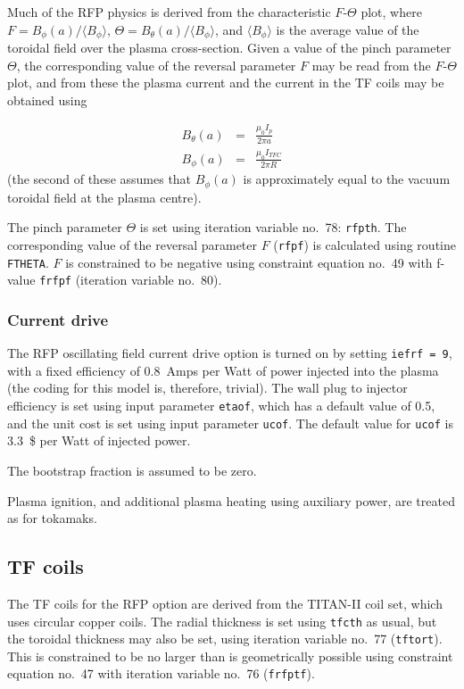 \documentclass[11pt,a4paper]{report}
\begin{document}
Much of the RFP physics is derived from the characteristic $F$-$\Theta$ plot,
where $F = B_\phi (a)/\langle B_\phi \rangle$, $\Theta = B_\theta (a)/\langle
B_\phi \rangle$, and $\langle B_\phi \rangle$ is the average value of the
toroidal field over the plasma cross-section. Given a value of the pinch
parameter $\Theta$, the corresponding value of the reversal parameter $F$ may
be read from the $F$-$\Theta$ plot, and from these the plasma current and the
current in the TF coils may be obtained using

\begin{eqnarray*}
  B_\theta (a) & = & \frac{\mu_0 I_p}{2\pi a} \\
  B_\phi (a)   & = & \frac{\mu_0 I_{TFC}}{2\pi R}
\end{eqnarray*}
(the second of these assumes that $B_\phi (a)$ is approximately equal to the
vacuum toroidal field at the plasma centre).

The pinch parameter $\Theta$ is set using iteration variable no.\ 78:
\texttt{rfpth}. The corresponding value of the reversal parameter $F$
(\texttt{rfpf}) is calculated using routine \texttt{FTHETA}. $F$ is
constrained to be negative using constraint equation no.\ 49 with f-value
\texttt{frfpf} (iteration variable no.\ 80).

\subsubsection{Current drive}
\label{sec:rfpcd}

The RFP oscillating field current drive option is turned on by setting
\texttt{iefrf = 9}, with a fixed efficiency of 0.8~Amps per Watt of power
injected into the plasma (the coding for this model is, therefore,
trivial). The wall plug to injector efficiency is set using input parameter
\texttt{etaof}, which has a default value of 0.5, and the unit cost is set
using input parameter \texttt{ucof}. The default value for \texttt{ucof} is
3.3~\$ per Watt of injected power.

The bootstrap fraction is assumed to be zero.

Plasma ignition, and additional plasma heating using auxiliary power, are
treated as for tokamaks.

\subsection{TF coils}

The TF coils for the RFP option are derived from the TITAN-II coil set, which
uses circular copper coils. The radial thickness is set using \texttt{tfcth}
as usual, but the toroidal thickness may also be set, using iteration variable
no.\ 77 (\texttt{tftort}). This is constrained to be no larger than is
geometrically possible using constraint equation no.\ 47 with iteration
variable no.\ 76 (\texttt{frfptf}).
\end{document}
